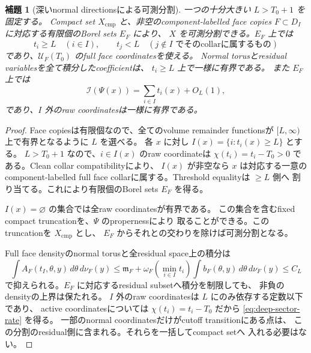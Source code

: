 \documentclass[11pt,a4paper]{ltjsarticle}
\newcommand{\cI}{\mathcal I}
\theoremstyle{plain}
\newtheorem{lemma}[lemma]{補題}
\theoremstyle{definition}
\theoremstyle{remark}
\begin{document}
\begin{lemma}[深いnormal directionsによる可測分割]
\label{lem:deep-sector-partition}
一つの十分大きい $L>T_0+1$ を固定する。
Compact set $X_{\mathrm{cmp}}$ と、非空のcomponent-labelled face copies
$F\subset D_I$ に対応する有限個のBorel sets $E_F$ により、
$X$ を可測分割できる。$E_F$ 上では
\[
 t_i\ge L\quad(i\in I),
 \qquad
 t_j<L\quad(j\notin I\text{ でそのcollarに属するもの})
\]
であり、$\mathcal U_F(T_0)$ のfull face coordinatesを使える。
Normal torusとresidual variablesを全て積分したcoefficientは、
$t_i\ge L$ 上で一様に有界である。
また $E_F$ 上では
\begin{equation}
\label{eq:deep-sector-rate}
 \cI(\Psi(x))=\sum_{i\in I}t_i(x)+O_L(1),
\end{equation}
であり、$I$ 外のraw coordinatesは一様に有界である。
\end{lemma}
\begin{proof}
Face copiesは有限個なので、全てのvolume remainder functionsが
$[L,\infty)$ 上で有界となるように $L$ を選べる。
各 $x$ に対し $I(x)=\{i:t_i(x)\ge L\}$ とする。
$L>T_0+1$ なので、$i\in I(x)$ のraw coordinateは
$\chi(t_i)=t_i-T_0>0$ である。Clean collar compatibilityにより、
$I(x)$ が非空なら $x$ は対応する一意のcomponent-labelled
full face collarに属する。Threshold equalityは $\ge L$ 側へ
割り当てる。これにより有限個のBorel sets $E_F$ を得る。

$I(x)=\varnothing$ の集合では全raw coordinatesが有界である。
この集合を含むfixed compact truncationを、$\Psi$ のpropernessにより
取ることができる。このtruncationを $X_{\mathrm{cmp}}$ とし、
$E_F$ からそれとの交わりを除けば可測分割となる。

Full face densityのnormal torusと全residual space上の積分は
\[
 \int A_F(t_I,\theta,y)\,d\theta\,d\nu_F(y)
 \le \mathfrak m_F+
 \omega_F\!\left(\min_{i\in I}t_i\right)
 \int b_F(\theta,y)\,d\theta\,d\nu_F(y)
 \le C_L
\]
で抑えられる。$E_F$ に対応するresidual subsetへ積分を制限しても、
非負のdensityの上界は保たれる。
$I$ 外のraw coordinatesは $L$ にのみ依存する定数以下であり、
active coordinatesについては $\chi(t_i)=t_i-T_0$ だから
\eqref{eq:deep-sector-rate} を得る。
一部のnormal coordinatesだけがcutoff transitionにある点は、
この分割のresidual側に含まれる。それらを一括してcompact setへ
入れる必要はない。
\end{proof}
\end{document}

